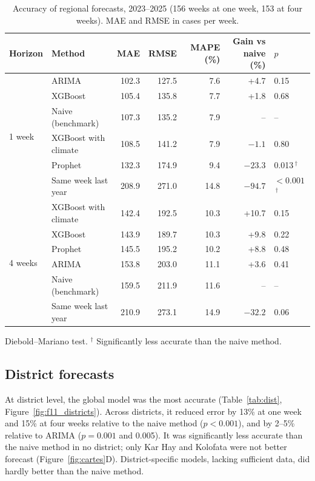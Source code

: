 \documentclass[11pt]{article}
\begin{document}
\begin{table}[!htbp]\centering\small
\caption{Accuracy of regional forecasts, 2023–2025 (156 weeks at one week, 153 at four weeks). MAE and RMSE in cases per week.}\label{tab:reg}
\begin{tabular}{@{}llrrrrl@{}}\toprule
Horizon & Method & MAE & RMSE & MAPE (\%) & Gain vs naive (\%) & $p$ \\\midrule
\multirow{6}{*}{1 week} & ARIMA & 102.3 & 127.5 & 7.6 & +4.7 & 0.15 \\
 & XGBoost & 105.4 & 135.8 & 7.7 & +1.8 & 0.68 \\
 & Naive (benchmark) & 107.3 & 135.2 & 7.9 & -- & -- \\
 & XGBoost with climate & 108.5 & 141.2 & 7.9 & $-1.1$ & 0.80 \\
 & Prophet & 132.3 & 174.9 & 9.4 & $-23.3$ & 0.013\,$^{\dagger}$ \\
 & Same week last year & 208.9 & 271.0 & 14.8 & $-94.7$ & $<0.001$\,$^{\dagger}$ \\\midrule
\multirow{6}{*}{4 weeks} & XGBoost with climate & 142.4 & 192.5 & 10.3 & +10.7 & 0.15 \\
 & XGBoost & 143.9 & 189.7 & 10.3 & +9.8 & 0.22 \\
 & Prophet & 145.5 & 195.2 & 10.2 & +8.8 & 0.48 \\
 & ARIMA & 153.8 & 203.0 & 11.1 & +3.6 & 0.41 \\
 & Naive (benchmark) & 159.5 & 211.9 & 11.6 & -- & -- \\
 & Same week last year & 210.9 & 273.1 & 14.9 & $-32.2$ & 0.06 \\\bottomrule
\end{tabular}
\par\smallskip\footnotesize\raggedright Diebold–Mariano test. $^{\dagger}$ Significantly less accurate than the naive method.
\end{table}


\subsection{District forecasts}
At district level, the global model was the most accurate (Table~\ref{tab:dist}, Figure~\ref{fig:f11_districts}). Across districts, it reduced error by 13\% at one week and 15\% at four weeks relative to the naive method ($p<0.001$), and by 2–5\% relative to ARIMA ($p=0.001$ and 0.005). It was significantly less accurate than the naive method in no district; only Kar Hay and Kolofata were not better forecast (Figure~\ref{fig:cartes}D). District-specific models, lacking sufficient data, did hardly better than the naive method.
\end{document}
